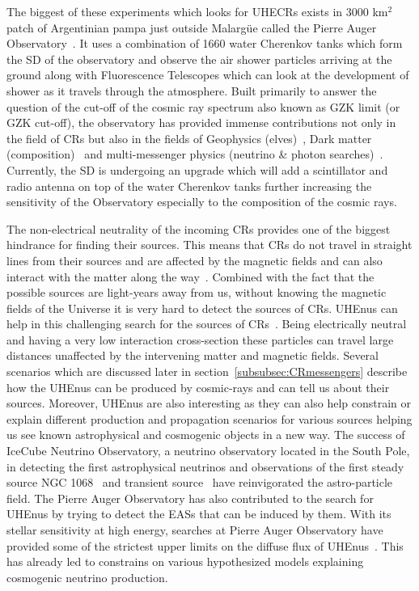 The biggest of these experiments which looks for \glspl{UHECR} exists in 3000 km$^2$ patch of Argentinian pampa just outside Malargüe called the Pierre Auger Observatory~\cite{Auger:2015}. It uses a combination of 1660 water Cherenkov tanks which form the \gls{SD} of the observatory and observe the air shower particles arriving at the ground along with Fluorescence Telescopes which can look at the development of shower as it travels through the atmosphere. Built primarily to answer the question of the cut-off of the cosmic ray spectrum also known as \gls{GZK} limit (or GZK cut-off), the observatory has provided immense contributions not only in the field of \glspl{CR} but also in the fields of Geophysics (elves)~\cite{Mussa_2022}, Dark matter (composition)~\cite{Abreu_2023} and multi-messenger physics (neutrino \& photon searches)~\cite{Aab_2019_point,Auger_photons_2022}. Currently, the \gls{SD} is undergoing an upgrade which will add a scintillator and radio antenna on top of the water Cherenkov tanks further increasing the sensitivity of the Observatory especially to the composition of the cosmic rays.

The non-electrical neutrality of the incoming \glspl{CR} provides one of the biggest hindrance for finding their sources. This means that \glspl{CR} do not travel in straight lines from their sources and are affected by the magnetic fields and can also interact with the matter along the way~\cite{bister2024largescaleanisotropyfluxdemagnification, ALLARD201233}. Combined with the fact that the possible sources are light-years away from us, without knowing the magnetic fields of the Universe it is very hard to detect the sources of \glspl{CR}. \glspl{UHEnu} can help in this challenging search for the sources of \glspl{CR}~\cite{UHEcorrelation_2016}. Being electrically neutral and having a very low interaction cross-section these particles can travel large distances unaffected by the intervening matter and magnetic fields. Several scenarios which are discussed later in section~\ref{subsubsec:CRmessengers} describe how the \glspl{UHEnu} can be produced by cosmic-rays and can tell us about their sources. Moreover, \glspl{UHEnu} are also interesting as they can also help constrain or explain different production and propagation scenarios for various sources helping us see known astrophysical and cosmogenic objects in a new way. The success of IceCube Neutrino Observatory, a neutrino observatory located in the South Pole,  in detecting the first astrophysical neutrinos and observations of the first steady source NGC 1068~\cite{Icecube_2022} and transient source~\cite{Icecube_txs} have reinvigorated the astro-particle field. The Pierre Auger Observatory has also contributed to the search for \glspl{UHEnu} by trying to detect the \glspl{EAS} that can be induced by them. With its stellar sensitivity at high energy, searches at Pierre Auger Observatory have provided some of the strictest upper limits on the diffuse flux of \glspl{UHEnu}~\cite{Aab_2019_diffuse}. This has already led to constrains on various hypothesized models explaining cosmogenic neutrino production.

